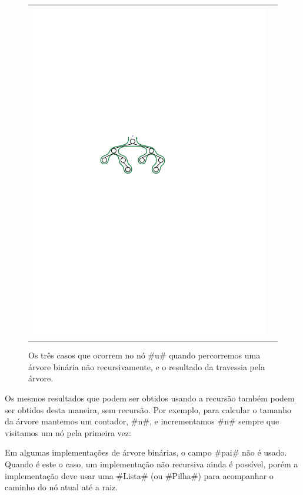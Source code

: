 \begin{figure}
\begin{center}
\begin{tabular}{cc}
      \includegraphics[scale=0.90909]{figs/bintree-3}
    \end{tabular}
  \end{center}
  \caption[Percorrendo uma BinaryTree]{Os três casos que ocorrem no nó
    #u# quando percorremos uma árvore binária não recursivamente, e o resultado da travessia pela árvore.}
\end{figure}

Os mesmos resultados que podem ser obtidos usando a recursão também podem ser obtidos desta maneira, sem recursão. Por exemplo, para calcular o tamanho 
da árvore mantemos um contador, #n#, e incrementamos #n# sempre que visitamos um nó pela primeira vez:

Em algumas implementações de árvore binárias, o campo #pai# não é usado.
Quando é este o caso, um implementação não recursiva ainda é possível,
porém a implementação deve usar uma #Lista# (ou #Pilha#) para acompanhar
o caminho do nó atual até a raiz.

